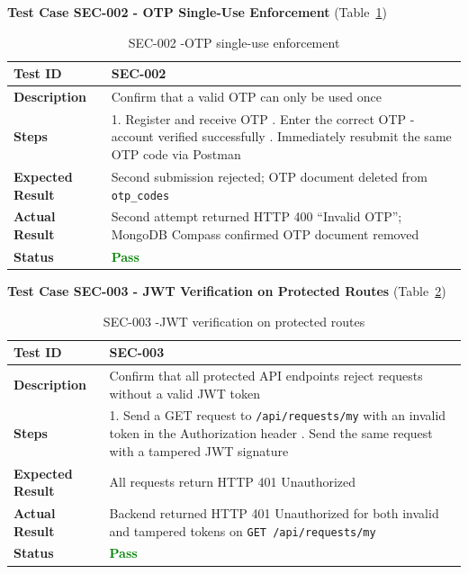 \textbf{Test Case SEC-002 - OTP Single-Use Enforcement} (Table~\ref{tab:sec002})
\begin{table}[H]
\caption{SEC-002 -OTP single-use enforcement}
\centering
\begin{tabular}{|l|p{10cm}|}
\hline
\textbf{Test ID} & SEC-002 \\
\hline
\textbf{Description} & Confirm that a valid OTP can only be used once \\
\hline
\textbf{Steps} &
1. Register and receive OTP \newline
2. Enter the correct OTP -account verified successfully \newline
3. Immediately resubmit the same OTP code via Postman \\
\hline
\textbf{Expected Result} & Second submission rejected; OTP document deleted from \texttt{otp\_codes} \\
\hline
\textbf{Actual Result} & Second attempt returned HTTP 400 ``Invalid OTP''; MongoDB Compass confirmed OTP document removed \\
\hline
\textbf{Status} & \textcolor{green}{\textbf{Pass}} \\
\hline
\end{tabular}

\label{tab:sec002}
\end{table}
\newpage
\textbf{Test Case SEC-003 - JWT Verification on Protected Routes} (Table~\ref{tab:sec003})
\begin{table}[H]
\caption{SEC-003 -JWT verification on protected routes}
\centering
\begin{tabular}{|l|p{8cm}|}
\hline
\textbf{Test ID} & SEC-003 \\
\hline
\textbf{Description} & Confirm that all protected API endpoints reject requests without a valid JWT token \\
\hline
\textbf{Steps} &
1. Send a GET request to \texttt{/api/requests/my} with an invalid token in the Authorization header \newline
2. Send the same request with a tampered JWT signature \\
\hline
\textbf{Expected Result} & All requests return HTTP 401 Unauthorized \\
\hline
\textbf{Actual Result} & Backend returned HTTP 401 Unauthorized for both invalid and tampered tokens on \texttt{GET /api/requests/my} \\
\hline
\textbf{Status} & \textcolor{green}{\textbf{Pass}} \\
\hline
\end{tabular}

\label{tab:sec003}
\end{table}

